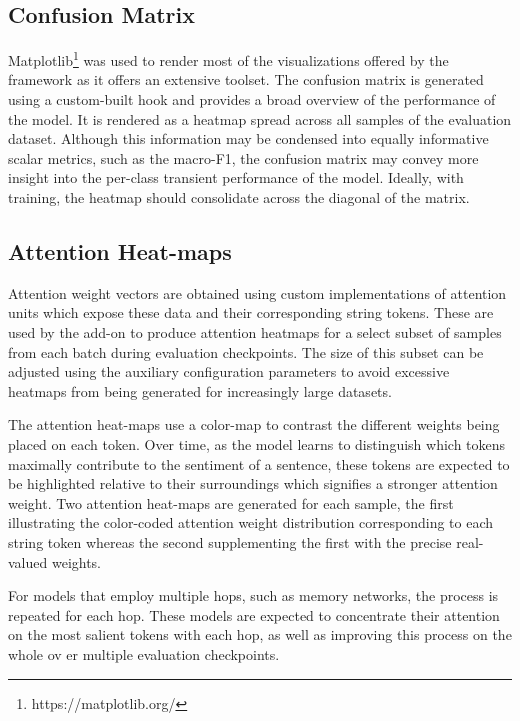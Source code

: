 \documentclass[../../fyp.tex]{subfiles}
\begin{document}
\subsection{Confusion Matrix}
Matplotlib\footnote{https://matplotlib.org/} was used to render most of the visualizations offered by the framework as it offers an extensive toolset. The confusion matrix is generated using a custom-built hook and provides a broad overview of the performance of the model. It is rendered as a heatmap spread across all samples of the evaluation dataset. Although this information may be condensed into equally informative scalar metrics, such as the macro-F1, the confusion matrix may convey more insight into the per-class transient performance of the model. Ideally, with training, the heatmap should consolidate across the diagonal of the matrix.

\subsection{Attention Heat-maps}
Attention weight vectors are obtained using custom implementations of attention units which expose these data and their corresponding string tokens. These are used by the add-on to produce attention heatmaps for a select subset of samples from each batch during evaluation checkpoints. The size of this subset can be adjusted using the auxiliary configuration parameters to avoid excessive heatmaps from being generated for increasingly large datasets. 

The attention heat-maps use a color-map to contrast the different weights being placed on each token. Over time, as the model learns to distinguish which tokens maximally contribute to the sentiment of a sentence, these tokens are expected to be highlighted relative to their surroundings which signifies a stronger attention weight. Two attention heat-maps are generated for each sample, the first illustrating the color-coded attention weight distribution corresponding to each string token whereas the second supplementing the first with the precise real-valued weights.

For models that employ multiple hops, such as memory networks, the process is repeated for each hop. These models are expected to concentrate their attention on the most salient tokens with each hop, as well as improving this process on the whole ov er multiple evaluation checkpoints.
\end{document}
